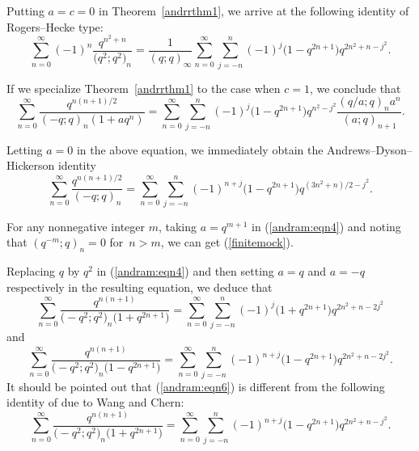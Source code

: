 \documentclass[pdftex]{sigma}
\numberwithin{equation}{section}
\begin{document}
Putting $a=c=0$ in Theorem~\ref{andrrthm1}, we arrive at the following identity of Rogers--Hecke type:
\begin{equation*}%
	\sum_{n=0}^\infty (-1)^n \frac{q^{n^2+n}}{\bigl(q^2; q^2\bigr)_n}
	=\frac{1}{(q; q)_\infty} \sum_{n=0}^\infty \sum_{j=-n}^n (-1)^j \bigl(1-q^{2n+1}\bigr) q^{2n^2+n-j^2}.
\end{equation*}

If we specialize Theorem~\ref{andrrthm1} to the case when $c=1$, we conclude that
\begin{equation}\label{andram:eqn4}
	\sum_{n=0}^\infty \frac{q^{n(n+1)/2}}{(-q; q)_n (1+aq^n)}
	=\sum_{n=0}^\infty \sum_{j=-n}^n (-1)^j \bigl(1-q^{2n+1}\bigr) q^{n^2-j^2} \frac{(q/a; q)_n a^n}{(a; q)_{n+1}}.
\end{equation}

Letting $a=0$ in the above equation, we immediately obtain the Andrews--Dyson--Hickerson identity \cite{ADH1988}
\begin{equation*}%
	\sum_{n=0}^\infty \frac{q^{n(n+1)/2}}{(-q; q)_n }
	=\sum_{n=0}^\infty \sum_{j=-n}^n (-1)^{n+j} \bigl(1-q^{2n+1}\bigr) q^{(3n^2+n)/2-j^2}.
\end{equation*}

For any nonnegative integer $m$, taking $a=q^{m+1}$ in (\ref{andram:eqn4}) and noting that $(q^{-m}; q)_n=0$ for~${n>m}$,
we can get (\ref{finitemock}).


Replacing $q$ by $q^2$ in (\ref{andram:eqn4}) and then setting $a=q$ and $a=-q$ respectively in the resulting equation, we deduce that
\begin{equation}\label{andram:eqn6}
	\sum_{n=0}^\infty \frac{q^{n(n+1)}}{\bigl(-q^2; q^2\bigr)_n \bigl(1+q^{2n+1}\bigr)}
	=\sum_{n=0}^\infty \sum_{j=-n}^n (-1)^{j} \bigl(1+q^{2n+1}\bigr) q^{2n^2+n-2j^2}
\end{equation}
and
\begin{equation*}%
	\sum_{n=0}^\infty \frac{q^{n(n+1)}}{\bigl(-q^2; q^2\bigr)_n \bigl(1-q^{2n+1}\bigr)}
	=\sum_{n=0}^\infty \sum_{j=-n}^n (-1)^{n+j} \bigl(1-q^{2n+1}\bigr) q^{2n^2+n-2j^2}.
\end{equation*}
It should be pointed out that (\ref{andram:eqn6}) is different from the following identity of \cite[equation~(2.8)]{WangChern2019} due to Wang and Chern:
\begin{equation*}%
	\sum_{n=0}^\infty \frac{q^{n(n+1)}}{\bigl(-q^2; q^2\bigr)_n \bigl(1+q^{2n+1}\bigr)}
	=\sum_{n=0}^\infty \sum_{j=-n}^n (-1)^{n+j} \bigl(1-q^{2n+1}\bigr) q^{2n^2+n-j^2}.
\end{equation*}
\end{document}
